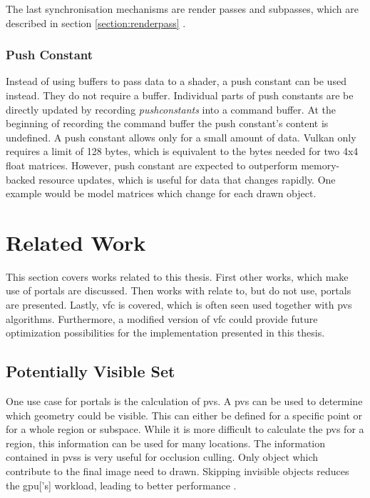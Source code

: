 The last synchronisation mechanisms are render passes and subpasses, which are described in section \ref{section:renderpass} \cite{khronos:vulkan:spec1.1}.



\subsection{Push Constant}

Instead of using buffers to pass data to a shader, a push constant can be used instead. They do not require a buffer. Individual parts of push constants are be directly updated by recording \textit{pushconstants} into a command buffer. At the beginning of recording the command buffer the push constant's content is undefined. A push constant allows only for a small amount of data. Vulkan only requires a limit of 128 bytes, which is equivalent to the bytes needed for two 4x4 float matrices. However, push constant are expected to outperform memory-backed resource updates, which is useful for data that changes rapidly. One example would be model matrices which change for each drawn object. 


\chapter{Related Work}
This section covers works related to this thesis. First other works, which make use of portals are discussed. Then works with relate to, but do not use, portals are presented. Lastly, \gls{vfc} is covered, which is often seen used together with \gls{pvs} algorithms. Furthermore, a modified version of \gls{vfc} could provide future optimization possibilities for the implementation presented in this thesis.


\section{Potentially Visible Set}

One use case for portals is the calculation of \gls{pvs}. A \gls{pvs} can be used to determine which geometry could be visible. This can either be defined for a specific point or for a whole region or subspace. While it is more difficult to calculate the \gls{pvs} for a region, this information can be used for many locations. The information contained in \glspl{pvs} is very useful for occlusion culling. Only object which contribute to the final image need to drawn. Skipping invisible objects reduces the \gls{gpu}['s] workload, leading to better performance \cite{cohen:2003:survey}.

